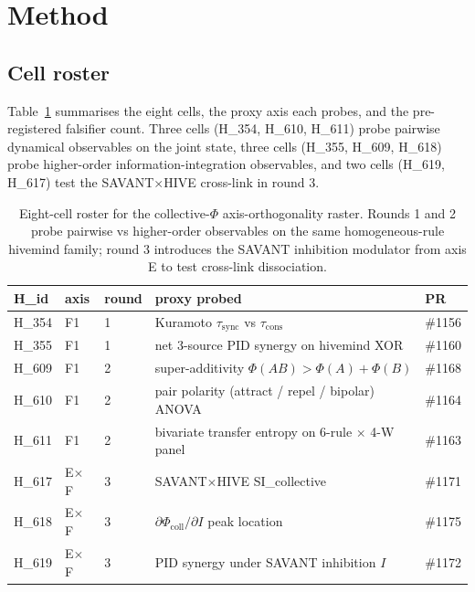 \documentclass[11pt,a4paper]{article}
\begin{document}
\section{Method}
\label{sec:method}

\subsection{Cell roster}
\label{sec:roster}

Table~\ref{tab:roster} summarises the eight cells, the proxy axis each
probes, and the pre-registered falsifier count. Three cells (H\_354,
H\_610, H\_611) probe pairwise dynamical observables on the joint
state, three cells (H\_355, H\_609, H\_618) probe higher-order
information-integration observables, and two cells (H\_619, H\_617)
test the SAVANT$\times$HIVE cross-link in round 3.

\begin{table}[h]
\centering
\small
\begin{tabular}{lllll}
\toprule
\textbf{H\_id} & \textbf{axis} & \textbf{round} &
\textbf{proxy probed} & \textbf{PR} \\
\midrule
H\_354 & F1 & 1 & Kuramoto $\tau_{\mathrm{sync}}$ vs $\tau_{\mathrm{cons}}$ & \#1156 \\
H\_355 & F1 & 1 & net 3-source PID synergy on hivemind XOR & \#1160 \\
H\_609 & F1 & 2 & super-additivity $\Phi(AB) > \Phi(A) + \Phi(B)$ & \#1168 \\
H\_610 & F1 & 2 & pair polarity (attract / repel / bipolar) ANOVA & \#1164 \\
H\_611 & F1 & 2 & bivariate transfer entropy on 6-rule $\times$ 4-W panel & \#1163 \\
H\_617 & E$\times$F & 3 & SAVANT$\times$HIVE SI\_collective & \#1171 \\
H\_618 & E$\times$F & 3 & $\partial\Phi_{\mathrm{coll}} / \partial I$ peak location & \#1175 \\
H\_619 & E$\times$F & 3 & PID synergy under SAVANT inhibition $I$ & \#1172 \\
\bottomrule
\end{tabular}
\caption{Eight-cell roster for the collective-$\Phi$ axis-orthogonality
raster. Rounds 1 and 2 probe pairwise vs higher-order observables on
the same homogeneous-rule hivemind family; round 3 introduces the
SAVANT inhibition modulator from axis E to test cross-link
dissociation.}
\label{tab:roster}
\end{table}
\end{document}
